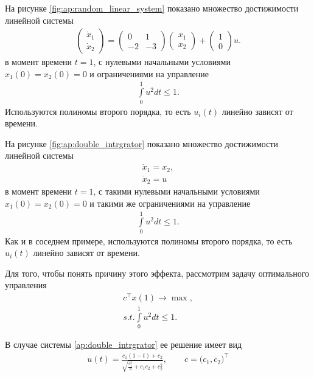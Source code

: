 \documentclass[../main.tex]{subfiles}
\begin{document}
  На рисунке \ref{fig:ap:random_linear_system} показано множество достижимости линейной системы
  \begin{gather}\label{ap:random_linear_system}
  	\begin{pmatrix} 
  		\dot{x}_1 \\
  		\dot{x}_2  
  	\end{pmatrix} = 
  	\begin{pmatrix}
  		0 & 1 \\
  		-2 & -3
  	\end{pmatrix}
  	\begin{pmatrix} 
  		x_1 \\
  		x_2  
  	\end{pmatrix} +
  	\begin{pmatrix} 1 \\ 0
  	\end{pmatrix} u.
  \end{gather}
  в момент времени $t = 1$, с нулевыми начальными условиями  $x_1(0) = x_2(0) = 0 $ и ограничениями на управление 
  \begin{gather*}
  	\int\limits_0^1 u^2dt \leqslant 1.
  \end{gather*}
  Используются полиномы второго порядка, то есть $u_i(t) $ линейно зависят от времени.
  
    На рисунке \ref{fig:ap:double_intrgrator} показано множество достижимости линейной системы
  \begin{gather}\label{ap:double_intrgrator}
    \dot{x}_1 = x_2,\\
  	\dot{x}_2 =  u
  \end{gather}
  в момент времени $t = 1$, с такими нулевыми начальными условиями  $x_1(0) = x_2(0) = 0 $ и такими же ограничениями на управление 
  \begin{gather*}
  	\int\limits_0^1 u^2dt \leqslant 1.
  \end{gather*}
  Как и в соседнем примере, используются полиномы второго порядка, то есть $u_i(t) $ линейно зависят от времени.
  
  Для того, чтобы понять причину этого эффекта, рассмотрим задачу оптимального управления
  \begin{gather*}
  	c^{\top} x(1) \rightarrow \max, \\
  	s.t. 	\int\limits_0^1 u^2dt \leqslant 1.
  \end{gather*}
  
  В случае системы \eqref{ap:double_intrgrator} ее решение имеет вид
  \begin{gather*}
  	u(t) = \frac{c_1(1 - t) + c_2}{\sqrt{\frac{c_1^2}{3} + c_1 c_2 + c_2^2}}, \qquad c = \big(c_1, c_2 \big)^{\top}
  \end{gather*}
  
\end{document}
